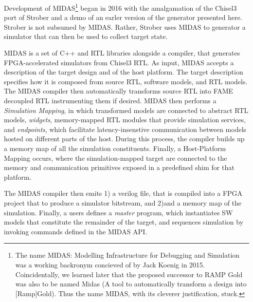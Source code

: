 Development of MIDAS\footnote{The name MIDAS: Modelling Infrastructure for
Debugging and Simulation was a working backronym concieved of by Jack Koenig in
2015. Coincidentally, we learned later that the proposed successor to RAMP Gold
was also to be named Midas (A tool to automatically transform a design into
[Ramp]Gold). Thus the name MIDAS, with its cleverer justification, stuck.} began in 2016
with the amalgamation of the Chisel3 port of Strober and a demo of an earler
version of the generator presented here. Strober is not subsumed by MIDAS.
Rather, Strober uses MIDAS to generator a simulator that can then be used to
collect target state.

MIDAS is a set of C++ and RTL libraries alongside a compiler, that generates
FPGA-accelerated simulators from Chisel3 RTL. As input, MIDAS accepts a
description of the target design and of the host platform. The target
description specifies how it is composed from source RTL, software models, and
RTL models. The MIDAS compiler then automatically transforms source RTL into
FAME decoupled RTL instrumenting them if desired. MIDAS then performs a
\emph{Simulation Mapping}, in which transformed models are connected to
abstract RTL models, \textit{widgets}, memory-mapped RTL modules that provide
simulation services, and \textit{endpoints}, which facilitate
latency-insenstive communication between models hosted on different parts of
the host. During this process, the compiler builds up a memory map of all the
simulation constituents.  Finally, a {Host-Platform Mapping} occurs, where the
simulation-mapped target are connected to the memory and communication
primitives exposed in a predefined shim for that platform.

The MIDAS compiler then emits 1) a verilog file, that is compiled into a FPGA
project that to produce a simulator bitstream, and 2)and a memory map of the
simulation. Finally, a users defines a \emph{master} program, which
instantiates SW models that constitute the remainder of the target, and
sequences simulation by invoking commands defined in the MIDAS API.

